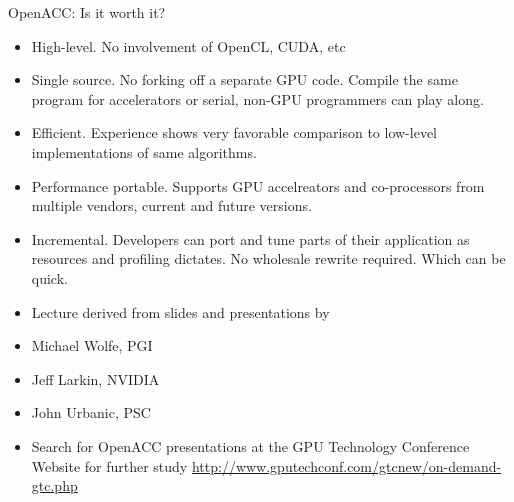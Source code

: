 \documentclass[10pt,t]{beamer}
\begin{document}
\begin{frame}{ OpenACC: Is it worth it?}
  \begin{itemize}
    \item High-level. No involvement of OpenCL, CUDA, etc
    \item Single source. No forking off a separate GPU code. Compile the same program for accelerators or serial, non-GPU programmers can play along.
    \item Efficient. Experience shows very favorable comparison to low-level implementations of same algorithms.
    \item Performance portable. Supports GPU accelreators and co-processors from multiple vendors, current and future versions.
    \item Incremental. Developers can port and tune parts of their application as resources and profiling dictates. No wholesale rewrite required. Which can be quick.
  \end{itemize}
\end{frame}

\begin{frame}
  \begin{itemize}
    \item[] Lecture derived from slides and presentations by
    \item Michael Wolfe, PGI
    \item Jeff Larkin, NVIDIA
    \item John Urbanic, PSC
    \item[] Search for OpenACC presentations at the GPU Technology Conference Website for further study \url{http://www.gputechconf.com/gtcnew/on-demand-gtc.php}
  \end{itemize}
\end{frame}
\end{document}
